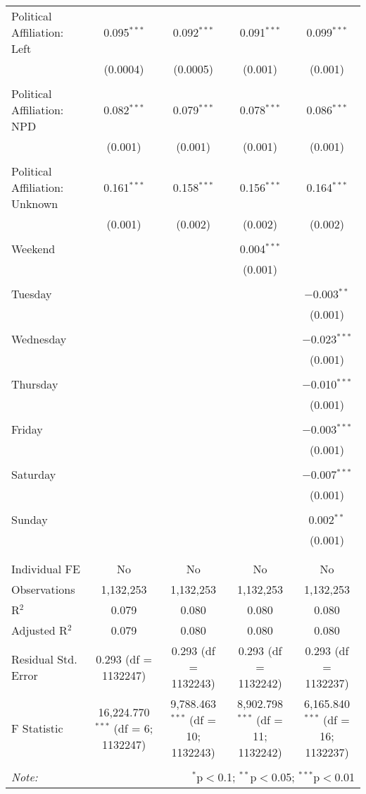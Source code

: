 \documentclass[
]{article}
\begin{document}
\begin{table}[!htbp]
{\begin{tabular}{@{\extracolsep{5pt}}lcccc}
 Political Affiliation: Left & 0.095$^{***}$ & 0.092$^{***}$ & 0.091$^{***}$ & 0.099$^{***}$ \\ 
  & (0.0004) & (0.0005) & (0.001) & (0.001) \\ 
  & & & & \\ 
 Political Affiliation: NPD & 0.082$^{***}$ & 0.079$^{***}$ & 0.078$^{***}$ & 0.086$^{***}$ \\ 
  & (0.001) & (0.001) & (0.001) & (0.001) \\ 
  & & & & \\ 
 Political Affiliation: Unknown & 0.161$^{***}$ & 0.158$^{***}$ & 0.156$^{***}$ & 0.164$^{***}$ \\ 
  & (0.001) & (0.002) & (0.002) & (0.002) \\ 
  & & & & \\ 
 Weekend &  &  & 0.004$^{***}$ &  \\ 
  &  &  & (0.001) &  \\ 
  & & & & \\ 
 Tuesday &  &  &  & $-$0.003$^{**}$ \\ 
  &  &  &  & (0.001) \\ 
  & & & & \\ 
 Wednesday &  &  &  & $-$0.023$^{***}$ \\ 
  &  &  &  & (0.001) \\ 
  & & & & \\ 
 Thursday &  &  &  & $-$0.010$^{***}$ \\ 
  &  &  &  & (0.001) \\ 
  & & & & \\ 
 Friday &  &  &  & $-$0.003$^{***}$ \\ 
  &  &  &  & (0.001) \\ 
  & & & & \\ 
 Saturday &  &  &  & $-$0.007$^{***}$ \\ 
  &  &  &  & (0.001) \\ 
  & & & & \\ 
 Sunday &  &  &  & 0.002$^{**}$ \\ 
  &  &  &  & (0.001) \\ 
  & & & & \\ 
\hline \\[-1.8ex] 
Individual FE & No & No & No & No \\ 
Observations & 1,132,253 & 1,132,253 & 1,132,253 & 1,132,253 \\ 
R$^{2}$ & 0.079 & 0.080 & 0.080 & 0.080 \\ 
Adjusted R$^{2}$ & 0.079 & 0.080 & 0.080 & 0.080 \\ 
Residual Std. Error & 0.293 (df = 1132247) & 0.293 (df = 1132243) & 0.293 (df = 1132242) & 0.293 (df = 1132237) \\ 
F Statistic & 16,224.770$^{***}$ (df = 6; 1132247) & 9,788.463$^{***}$ (df = 10; 1132243) & 8,902.798$^{***}$ (df = 11; 1132242) & 6,165.840$^{***}$ (df = 16; 1132237) \\ 
\hline 
\hline \\[-1.8ex] 
\textit{Note:}  & \multicolumn{4}{r}{$^{*}$p$<$0.1; $^{**}$p$<$0.05; $^{***}$p$<$0.01} \\ 
\end{tabular}
} 
\end{table} 
\newpage
\end{document}
